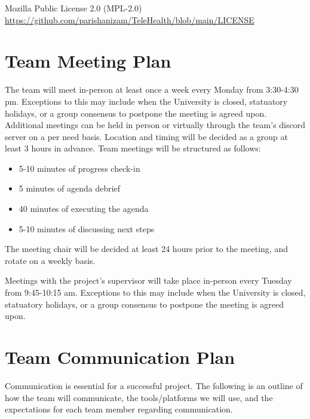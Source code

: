 \documentclass{article}
\begin{document}
Mozilla Public License 2.0 (MPL-2.0) \\
\url{https://github.com/parishanizam/TeleHealth/blob/main/LICENSE}

\section{Team Meeting Plan}

The team will meet in-person at least once a week every Monday from 3:30-4:30 pm. Exceptions to this 
may include when the University is closed, statuatory holidays, or a group consensus to postpone the meeting
is agreed upon. Additional meetings can be held in person or virtually through the team's discord server on 
a per need basis. Location and timing will be decided as a group at least 3 hours in advance. Team meetings will
be structured as follows:
\begin{itemize}
  \item 5-10 minutes of progress check-in 
  \item 5 minutes of agenda debrief
  \item 40 minutes of executing the agenda
  \item 5-10 minutes of discussing next steps
\end{itemize}
The meeting chair will be decided at least 24 hours prior to the meeting, and rotate on a weekly basis.

Meetings with the project's supervisor will take place in-person every Tuesday from 9:45-10:15 am. Exceptions 
to this may include when the University is closed, statuatory holidays, or a group consensus to postpone the 
meeting is agreed upon.

\section{Team Communication Plan}

Communication is essential for a successful project. The following is an outline of how the team will 
communicate, the tools/platforms we will use, and the expectations for each team member regarding communication.
\end{document}
